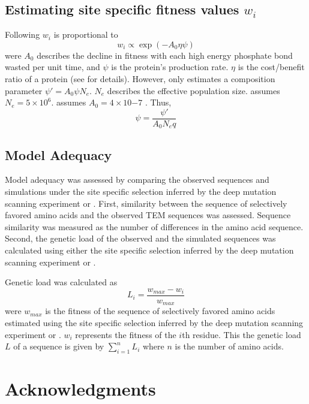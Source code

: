 \subsection{Estimating site specific fitness values $w_i$}

Following \citet{beaulieu2018} $w_i$ is proportional to
\begin{equation}
w_i \propto \exp(-A_0\eta\psi)
\end{equation}
were $A_0$ describes the decline in fitness with each high energy phosphate bond wasted per unit time, and $\psi$ is the protein's production rate.
$\eta$ is the cost/benefit ratio of a protein (see \citep{beaulieu2018} for details). 
However, \selac only estimates a composition parameter $\psi' = A_0\psi N_e$.
$N_e$ describes the effective population size.
\selac assumes $N_e = 5\times 10^6$.
\selac assumes $A_0 = 4 \times 10{-7}$ \citep{gilchrist2007}.
Thus, 
\begin{equation}
\psi = \frac{\psi'}{A_0N_eq}
\end{equation}


\subsection{Model Adequacy}

Model adequacy was assessed by comparing the observed sequences and simulations under the site specific selection inferred by the deep mutation scanning experiment or \selac.
First, similarity between the sequence of selectively favored amino acids and the observed TEM sequences was assessed.
Sequence similarity was measured as the number of differences in the amino acid sequence.
Second, the genetic load of the observed and the simulated sequences was calculated using either the site specific selection inferred by the deep mutation scanning experiment or \selac.

Genetic load was calculated as
\begin{equation}
L_i = \frac{w_{max} - w_i}{w_{max}}
\end{equation}
were $w_{max}$ is the fitness of the sequence of selectively favored amino acids estimated using  the site specific selection inferred by the deep mutation scanning experiment or \selac.
$w_i$ represents the fitness of the $i$th residue.
This the genetic load $L$ of a sequence is given by $\sum_{i=1}^n L_i$ where $n$ is the number of amino acids.

\section{Acknowledgments}

